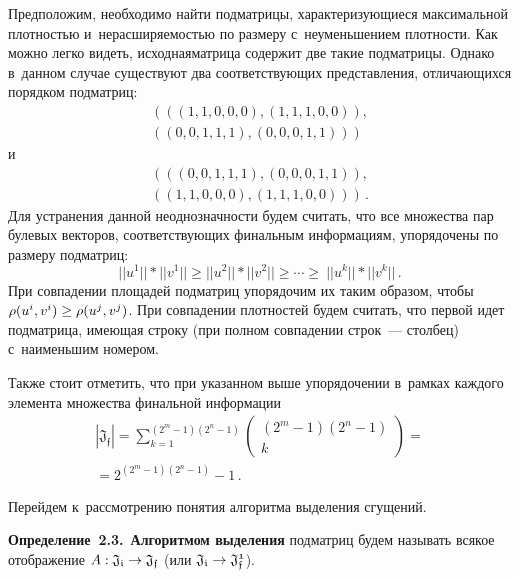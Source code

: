 \begin{multicols}{2}
Предположим, необходимо найти подматрицы, характеризующиеся максимальной 
плотностью и~нерасширяемостью по размеру с~неуменьшением плот\-ности. Как можно 
легко видеть, исходная\linebreak матрица содержит две такие подматрицы.
Однако в~данном случае существуют два со\-от\-вет\-ст\-ву\-ющих представления, 
отличающихся порядком подматриц: 
\begin{multline*}
\left(\left( (1,1,0,0,0),(1,1,1,0,0)\right),\right.\\
\left.\left((0,0,1,1,1), (0,0,0,1,1)\right)\right)
\end{multline*}
 и
 \begin{multline*}
\left(\left((0,0,1,1,1),  (0,0,0,1,1)\right),\right.\\ 
\left.\left((1,1,0,0,0),(1,1,1,0,0)\right)\right)\,.
\end{multline*}
Для устранения данной неоднозначности будем считать, что все множества пар 
булевых векторов, соответствующих финальным информациям, упорядочены по размеру 
подматриц:
$$
||u^1||*||v^1|| \geq ||u^2||*||v^2|| \geq \cdots \geq~||u^k||*||v^k||\,.
$$
 При 
совпадении площадей подматриц упорядочим их таким образом, чтобы $\rho(u^i, 
v^i)\hm \geq \rho(u^j,v^j)$. При совпадении плотностей будем считать, что первой 
идет подматрица, имеющая строку (при полном совпадении строк~--- столбец) 
с~наименьшим номером.

Также стоит отметить, что при указанном выше упорядочении в~рамках каждого 
элемента множества финальной информации 
\begin{multline*}
|\mathfrak{J_f}|=  \sum\limits_{k = 1}^{(2^m-1)(2^n- 1)}
\begin{pmatrix}
{(2^m-1)(2^n- 1)}\\
{k}\end{pmatrix}
={}\\
{}=2^{(2^m-1)(2^n- 1)} - 1\,.
\end{multline*}


Перейдем к~рассмотрению понятия алгоритма выделения сгущений.

\smallskip

\noindent
\textbf{Определение~2.3.}\ \textbf{Алгоритмом 
выделения} подматриц будем называть всякое отображение $A: \mathfrak{J_i} 
\hm\rightarrow \mathfrak{J_f}$ (или  $\mathfrak{J_i} \hm\rightarrow 
\mathfrak{J^1_f}$).

\smallskip


\end{multicols}
